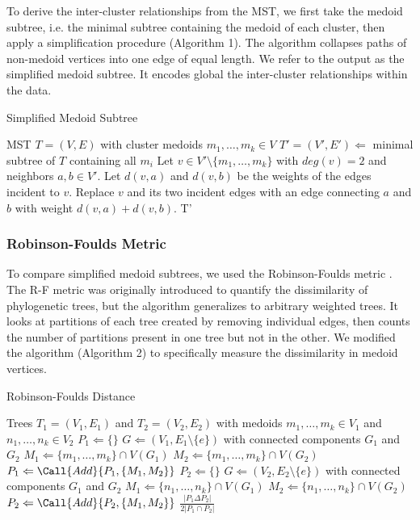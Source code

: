 \documentclass{article}
\begin{document}
{To derive the inter-cluster relationships from the MST, we first take the medoid subtree, i.e. the minimal subtree containing the medoid of each cluster, then apply a simplification procedure (Algorithm 1). The algorithm collapses paths of non-medoid vertices into one edge of equal length. We refer to the output as the simplified medoid subtree. It encodes global the inter-cluster relationships within the data.

\begin{algorithm}[t]
\caption{Simplified Medoid Subtree}\label{algo1}
\begin{algorithmic}[1]
\Require MST $T = (V, E)$ with cluster medoids $m_1, \hdots, m_k \in V$
\State $T' = (V', E') \Leftarrow$ minimal subtree of $T$ containing all $m_i$
\Repeat
	\State Let $v \in V' \setminus \{m_1,  \hdots, m_k\}$ with $deg(v) = 2$ and neighbors $a, b \in V'$. Let $d(v, a)$ and $d(v, b)$ be the weights of the edges incident to $v$.
	\State Replace $v$ and its two incident edges with an edge connecting $a$ and $b$ with weight $d(v, a) + d(v, b)$.
\State \Output T'
\end{algorithmic}
\end{algorithm}

\subsubsection{Robinson-Foulds Metric}
To compare simplified medoid subtrees, we used the Robinson-Foulds metric \cite{RF_metric}. The R-F metric was originally introduced to quantify the dissimilarity of phylogenetic trees, but the algorithm generalizes to arbitrary weighted trees. It looks at partitions of each tree created by removing individual edges, then counts the number of partitions present in one tree but not in the other. We modified the algorithm (Algorithm 2) to specifically measure the dissimilarity in medoid vertices.

\begin{algorithm}[b]
\caption{Robinson-Foulds Distance}\label{algo2}
\begin{algorithmic}[2]
\Require Trees $T_1 = (V_1,E_1)$ and $T_2 = (V_2, E_2)$ with medoids $m_1, \hdots, m_k \in V_1$ and $n_1, \hdots, n_k \in V_2$
\State $P_1 \Leftarrow \{\}$
	\State $G \Leftarrow (V_1, E_1 \setminus \{e\})$ with connected components $G_1$ and $G_2$
	\State $M_1 \Leftarrow \{m_1,\hdots,m_k\} \cap V(G_1)$
	\State $M_2 \Leftarrow \{m_1,\hdots,m_k\} \cap V(G_2)$
	\State $P_1 \Leftarrow \Call{Add}{P_1, \{M_1, M_2\}}$
\EndFor
\State $P_2 \Leftarrow \{\}$
	\State $G \Leftarrow (V_2, E_2 \setminus \{e\})$ with connected components $G_1$ and $G_2$
	\State $M_1 \Leftarrow \{n_1,\hdots,n_k\} \cap V(G_1)$
	\State $M_2 \Leftarrow \{n_1,\hdots,n_k\} \cap V(G_2)$
	\State $P_2 \Leftarrow \Call{Add}{P_2, \{M_1, M_2\}}$
\EndFor
\State \Output $\frac{\left|P_1 \Delta P_2 \right|}{2\left| P_1 \cap P_2 \right|}$
\end{algorithmic}
\end{algorithm}

}
\end{document}

